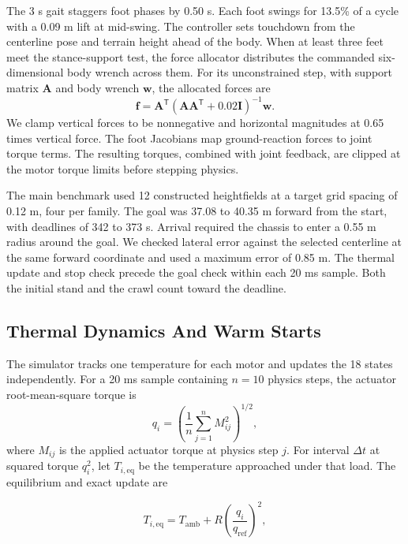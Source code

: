 \documentclass{ieeeaccess}
\begin{document}
The 3 s gait staggers foot phases by 0.50 s. Each foot swings for 13.5\% of a cycle with a 0.09 m lift at mid-swing. The controller sets touchdown from the centerline pose and terrain height ahead of the body. When at least three feet meet the stance-support test, the force allocator distributes the commanded six-dimensional body wrench across them. For its unconstrained step, with support matrix $\mathbf{A}$ and body wrench $\mathbf{w}$, the allocated forces are
\begin{equation}
\mathbf{f}=\mathbf{A}^{\mathsf T}
   \left(\mathbf{A}\mathbf{A}^{\mathsf T}
    +0.02\mathbf{I}\right)^{-1}\mathbf{w}.
\end{equation}
We clamp vertical forces to be nonnegative and horizontal magnitudes at 0.65 times vertical force. The foot Jacobians map ground-reaction forces to joint torque terms. The resulting torques, combined with joint feedback, are clipped at the motor torque limits before stepping physics.

The main benchmark used 12 constructed heightfields at a target grid spacing of 0.12 m, four per family. The goal was 37.08 to 40.35 m forward from the start, with deadlines of 342 to 373 s. Arrival required the chassis to enter a 0.55 m radius around the goal. We checked lateral error against the selected centerline at the same forward coordinate and used a maximum error of 0.85 m. The thermal update and stop check precede the goal check within each 20 ms sample. Both the initial stand and the crawl count toward the deadline.

\subsection{Thermal Dynamics And Warm Starts}

The simulator tracks one temperature for each motor and updates the 18 states independently. For a 20 ms sample containing $n=10$ physics steps, the actuator root-mean-square torque is
\begin{equation}
q_i=\left(\frac{1}{n}\sum_{j=1}^n M_{ij}^2\right)^{1/2},
\end{equation}
where $M_{ij}$ is the applied actuator torque at physics step $j$. For interval $\Delta t$ at squared torque $q_i^2$, let $T_{i,\mathrm{eq}}$ be the temperature approached under that load. The equilibrium and exact update are

\begin{equation}
T_{i,\mathrm{eq}} = T_{\mathrm{amb}} + R\left(\frac{q_i}{q_{\mathrm{ref}}}\right)^2 ,
\label{eq:equilibrium}
\end{equation}
\end{document}

